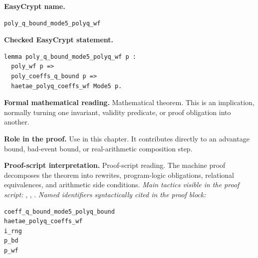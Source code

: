 \begin{formaltheorem}
\noindent\textbf{EasyCrypt name.}
\begin{lstlisting}[language=EasyCrypt,basicstyle=\ttfamily\scriptsize]
poly_q_bound_mode5_polyq_wf
\end{lstlisting}
\noindent\textbf{Checked EasyCrypt statement.}
\begin{lstlisting}[language=EasyCrypt,basicstyle=\ttfamily\scriptsize]
lemma poly_q_bound_mode5_polyq_wf p :
  poly_wf p =>
  poly_coeffs_q_bound p =>
  haetae_polyq_coeffs_wf Mode5 p.
\end{lstlisting}
\noindent\textbf{Formal mathematical reading.}
Mathematical theorem. This is an implication, normally turning one invariant, validity predicate, or proof obligation into another.

\noindent\textbf{Role in the proof.}
Use in this chapter. It contributes directly to an advantage bound, bad-event bound, or real-arithmetic composition step.

\noindent\textbf{Proof-script interpretation.}
Proof-script reading. The machine proof decomposes the theorem into rewrites, program-logic obligations, relational equivalences, and arithmetic side conditions.
\emph{Main tactics visible in the proof script:} , , .
\emph{Named identifiers syntactically cited in the proof block:}
\begin{lstlisting}[language=EasyCrypt,basicstyle=\ttfamily\scriptsize]
coeff_q_bound_mode5_polyq_bound
haetae_polyq_coeffs_wf
i_rng
p_bd
p_wf
\end{lstlisting}

\end{formaltheorem}

